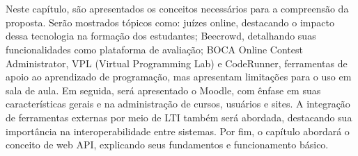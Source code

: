 

\chapter{}

Neste capítulo, são apresentados os conceitos necessários para a compreensão da proposta. Serão mostrados tópicos como: juízes online, destacando o impacto dessa tecnologia na formação dos estudantes; Beecrowd, detalhando suas funcionalidades como plataforma de avaliação; BOCA Online Contest Administrator, VPL (Virtual Programming Lab) e CodeRunner,  ferramentas de apoio ao aprendizado de programação, mas apresentam limitações para o uso em sala de aula. Em seguida, será apresentado o Moodle, com ênfase em suas características gerais e na administração de cursos, usuários e sites. A integração de ferramentas externas por meio de LTI também será abordada, destacando sua importância na interoperabilidade entre sistemas. Por fim, o capítulo abordará o conceito de web API, explicando seus fundamentos e funcionamento básico.


